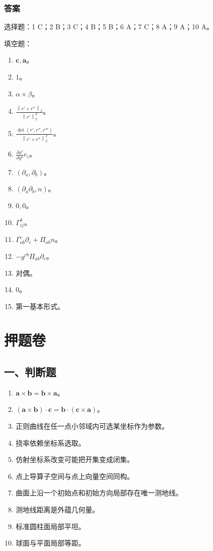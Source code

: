 \documentclass[UTF8,12pt,a4paper]{ctexart}
\newcommand{\vct}[1]{\boldsymbol{#1}}
\newcommand{\norm}[1]{\left\lVert #1\right\rVert}
\begin{document}
\subsubsection*{答案}
选择题：1 C；2 B；3 C；4 B；5 B；6 A；7 C；8 A；9 A；10 A。

填空题：
\begin{enumerate}
\item $\vct c,\vct a$。
\item $1$。
\item $\alpha\times\beta$。
\item $\displaystyle \frac{\norm{r'\times r''}_2}{\norm{r'}_2^3}$。
\item $\displaystyle \frac{\det(r',r'',r''')}{\norm{r'\times r''}_2^2}$。
\item $\displaystyle \frac{\partial x^i}{\partial y^a}e_i$。
\item $(\partial_a,\partial_b)$。
\item $(\partial_a\partial_b,n)$。
\item $0,0$。
\item $\Gamma^k_{ij}$。
\item $\Gamma^c_{ab}\partial_c+\Pi_{ab}n$。
\item $-g^{cb}\Pi_{ab}\partial_c$。
\item 对偶。
\item $0$。
\item 第一基本形式。
\end{enumerate}

\fi

\section{押题卷}

\subsection*{一、判断题}
\begin{enumerate}
\item $\vct a\times\vct b=\vct b\times\vct a$。
\item $(\vct a\times\vct b)\cdot\vct c=\vct b\cdot(\vct c\times\vct a)$。
\item 正则曲线在任一点小邻域内可选某坐标作为参数。
\item 挠率依赖坐标系选取。
\item 仿射坐标系改变可能把开集变成闭集。
\item 点上导算子空间与点上向量空间同构。
\item 曲面上沿一个初始点和初始方向局部存在唯一测地线。
\item 测地线距离是外蕴几何量。
\item 标准圆柱面局部平坦。
\item 球面与平面局部等距。
\end{enumerate}
\end{document}
